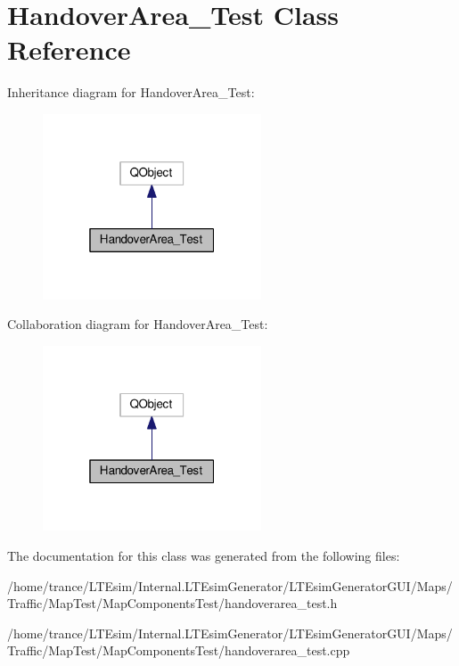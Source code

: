 \hypertarget{class_handover_area___test}{}\section{Handover\+Area\+\_\+\+Test Class Reference}
\label{class_handover_area___test}


Inheritance diagram for Handover\+Area\+\_\+\+Test\+:
\nopagebreak
\begin{figure}[H]
\begin{center}
\leavevmode
\includegraphics[width=184pt]{class_handover_area___test__inherit__graph}
\end{center}
\end{figure}


Collaboration diagram for Handover\+Area\+\_\+\+Test\+:
\nopagebreak
\begin{figure}[H]
\begin{center}
\leavevmode
\includegraphics[width=184pt]{class_handover_area___test__coll__graph}
\end{center}
\end{figure}


The documentation for this class was generated from the following files\+:\begin{DoxyCompactItemize}
\item 
/home/trance/\+L\+T\+Esim/\+Internal.\+L\+T\+Esim\+Generator/\+L\+T\+Esim\+Generator\+G\+U\+I/\+Maps/\+Traffic/\+Map\+Test/\+Map\+Components\+Test/handoverarea\+\_\+test.\+h\item 
/home/trance/\+L\+T\+Esim/\+Internal.\+L\+T\+Esim\+Generator/\+L\+T\+Esim\+Generator\+G\+U\+I/\+Maps/\+Traffic/\+Map\+Test/\+Map\+Components\+Test/handoverarea\+\_\+test.\+cpp\end{DoxyCompactItemize}
